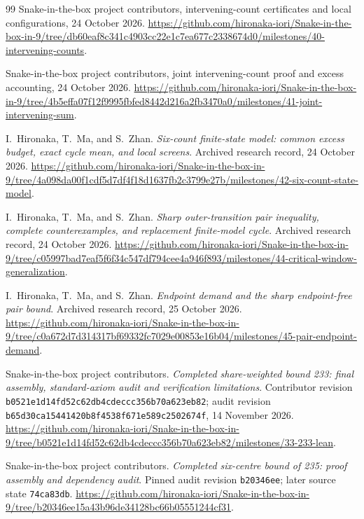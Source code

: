 \documentclass[11pt,a4paper]{article}
\theoremstyle{definition}
\theoremstyle{remark}
\begin{document}
\begin{thebibliography}{99}
Snake-in-the-box project contributors, intervening-count certificates and local configurations, 24 October 2026.
\url{https://github.com/hironaka-iori/Snake-in-the-box-in-9/tree/db60eaf8c341c4903cc22e1c7ea677c2338674d0/milestones/40-intervening-counts}.

Snake-in-the-box project contributors, joint intervening-count proof and excess accounting, 24 October 2026.
\url{https://github.com/hironaka-iori/Snake-in-the-box-in-9/tree/4b5effa07f12f9995fbfed8442d216a2fb3470a0/milestones/41-joint-intervening-sum}.

I.~Hironaka, T.~Ma, and S.~Zhan. \emph{Six-count finite-state model: common excess budget, exact cycle mean, and local screens}. Archived research record, 24 October 2026.
\url{https://github.com/hironaka-iori/Snake-in-the-box-in-9/tree/4a098da00f1cdf5d7df4f18d1637fb2c3799e27b/milestones/42-six-count-state-model}.

I.~Hironaka, T.~Ma, and S.~Zhan. \emph{Sharp outer-transition pair inequality, complete counterexamples, and replacement finite-model cycle}. Archived research record, 24 October 2026.
\url{https://github.com/hironaka-iori/Snake-in-the-box-in-9/tree/c05997bad7eaf5f6f34c547df794cee4a946f893/milestones/44-critical-window-generalization}.

I.~Hironaka, T.~Ma, and S.~Zhan. \emph{Endpoint demand and the sharp endpoint-free pair bound}. Archived research record, 25 October 2026.
\url{https://github.com/hironaka-iori/Snake-in-the-box-in-9/tree/c0a672d7d314317bf69332fc7029e00853e16b04/milestones/45-pair-endpoint-demand}.

Snake-in-the-box project contributors. \emph{Completed share-weighted bound
233: final assembly, standard-axiom audit and verification limitations}.
Contributor revision \texttt{b0521e1d14fd52c62db4cdeccc356b70a623eb82};
audit revision \texttt{b65d30ca15441420b8f4538f671e589c2502674f},
14 November 2026.
\url{https://github.com/hironaka-iori/Snake-in-the-box-in-9/tree/b0521e1d14fd52c62db4cdeccc356b70a623eb82/milestones/33-233-lean}.

Snake-in-the-box project contributors. \emph{Completed six-centre bound of 235: proof assembly and dependency audit}. Pinned audit revision \texttt{b20346ee}; later source state \texttt{74ca83db}.
\url{https://github.com/hironaka-iori/Snake-in-the-box-in-9/tree/b20346ee15a43b96de34128bc66b05551244cf31}.


\end{thebibliography}
\end{document}
